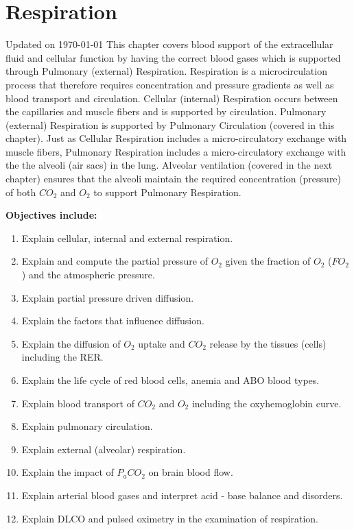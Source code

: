 \chapter{Respiration}\label{chp:blood_oxygen}
Updated on \today
\minitoc
This chapter covers blood support of the extracellular fluid and cellular function by having the correct blood gases which is supported through Pulmonary (external) Respiration. Respiration is a microcirculation process that therefore requires concentration and pressure gradients as well as blood transport and circulation. Cellular (internal) Respiration occurs between the capillaries and muscle fibers and is supported by circulation. Pulmonary (external) Respiration is supported by Pulmonary Circulation (covered in this chapter). Just as Cellular Respiration includes a micro-circulatory exchange with muscle fibers, Pulmonary Respiration includes a micro-circulatory exchange with the the alveoli (air sacs) in the lung. Alveolar ventilation (covered in the next chapter) ensures that the alveoli maintain the required concentration (pressure) of both $CO_2$ and $O_2$ to support Pulmonary Respiration.

\vspace{5mm}

\textbf{Objectives include:}
\begin{enumerate}
    \item Explain cellular, internal and external respiration.
    \item Explain and compute the partial pressure of $O_2$ given the fraction of $O_2$ ($FO_2$) and the atmospheric pressure.
    \item Explain partial pressure driven diffusion.
    \item Explain the factors that influence diffusion.
    \item Explain the diffusion of $O_2$ uptake and $CO_2$ release by the tissues (cells) including the RER.
    \item Explain the life cycle of red blood cells, anemia and ABO blood types.
    \item Explain blood transport of $CO_2$ and $O_2$ including the oxyhemoglobin curve.
    \item Explain pulmonary circulation.
    \item Explain external (alveolar) respiration.
    \item Explain the impact of $P_aCO_2$ on brain blood flow.
    \item Explain arterial blood gases and interpret acid - base balance and disorders.
    \item Explain DLCO and pulsed oximetry in the examination of respiration.
\end{enumerate}

